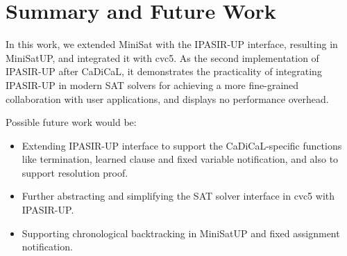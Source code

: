 \chapter{Summary and Future Work}

In this work, we extended MiniSat with the IPASIR-UP interface, resulting in MiniSatUP, and integrated it with cvc5. As the second implementation of IPASIR-UP after CaDiCaL, it demonstrates the practicality of integrating IPASIR-UP in modern SAT solvers for achieving a more fine-grained collaboration with user applications, and displays no performance overhead.

Possible future work would be:

\begin{itemize}
  \item Extending IPASIR-UP interface to support the CaDiCaL-specific functions like termination, learned clause and fixed variable notification, and also to support resolution proof.
  \item Further abstracting and simplifying the SAT solver interface in cvc5 with IPASIR-UP.
  \item Supporting chronological backtracking in MiniSatUP and fixed assignment notification.
\end{itemize}
